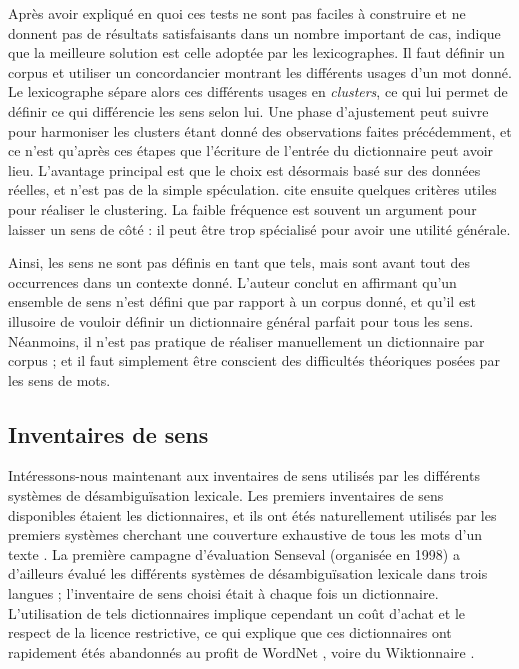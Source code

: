 Après avoir expliqué en quoi ces tests ne sont pas faciles à construire et ne
donnent pas de résultats satisfaisants dans un nombre important de cas,
\cite{kilgarriff1997don} indique que la meilleure solution est celle adoptée
par les lexicographes. Il faut définir un corpus et utiliser un concordancier
montrant les différents usages d'un mot donné. Le lexicographe sépare alors ces
différents usages en \textit{clusters}, ce qui lui permet de définir ce qui
différencie les sens selon lui. Une phase d'ajustement peut suivre pour
harmoniser les clusters étant donné des observations faites précédemment, et ce
n'est qu'après ces étapes que l'écriture de l'entrée du dictionnaire peut avoir
lieu. L'avantage principal est que le choix est désormais basé sur des données
réelles, et n'est pas de la simple spéculation. \cite{kilgarriff1997don} cite
ensuite quelques critères utiles pour réaliser le clustering. La faible
fréquence est souvent un argument pour laisser un sens de côté : il peut être
trop spécialisé pour avoir une utilité générale.

Ainsi, les sens ne sont pas définis en tant que tels, mais sont avant tout des
occurrences dans un contexte donné. L'auteur conclut en affirmant qu'un
ensemble de sens n'est défini que par rapport à un corpus donné, et qu'il est
illusoire de vouloir définir un dictionnaire général parfait pour tous les
sens. Néanmoins, il n'est pas pratique de réaliser manuellement un dictionnaire
par corpus ; et il faut simplement être conscient des difficultés théoriques
posées par les sens de mots. 

\subsection{Inventaires de sens}

Intéressons-nous maintenant aux inventaires de sens utilisés par les différents
systèmes de désambiguïsation lexicale. Les premiers inventaires de sens
disponibles étaient les dictionnaires, et ils ont étés naturellement utilisés
par les premiers systèmes cherchant une couverture exhaustive de tous les mots
d'un texte \citep{lesk1986automatic}. La première campagne d'évaluation
Senseval (organisée en 1998) \citep{kilgarriff2000introduction} a d'ailleurs
évalué les différents systèmes de désambiguïsation lexicale dans trois langues
; l'inventaire de sens choisi était à chaque fois un dictionnaire.
L'utilisation de tels dictionnaires implique cependant un coût d'achat et le
respect de la licence restrictive, ce qui explique que ces dictionnaires ont
rapidement étés abandonnés au profit de WordNet
\citep{edmonds2002introduction}, voire du Wiktionnaire
\citep{mouton2010jaws}.%

